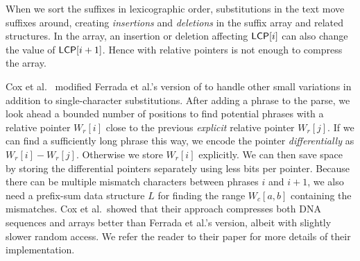 When we sort the suffixes in lexicographic order, substitutions in the text move suffixes around, creating \emph{insertions} and \emph{deletions} in the suffix array and related structures. In the \LCP{} array, an insertion or deletion affecting $\mathsf{LCP}[i]$ can also change the value of $\mathsf{LCP}[i+1]$. Hence \RLZ{} with relative pointers is not enough to compress the \LCP{} array.

Cox et al.~\cite{CoxEtAl16} modified Ferrada et al.'s version of \RLZ{} to handle other small variations in addition to single-character substitutions. After adding a phrase to the parse, we look ahead a bounded number of positions to find potential phrases with a relative pointer $W_{r}[i]$ close to the previous \emph{explicit} relative pointer $W_{r}[j]$. If we can find a sufficiently long phrase this way, we encode the pointer \emph{differentially} as $W_{r}[i] - W_{r}[j]$. Otherwise we store $W_{r}[i]$ explicitly. We can then save space by storing the differential pointers separately using less bits per pointer. Because there can be multiple mismatch characters between phrases $i$ and $i+1$, we also need a prefix-sum data structure $L$ for finding the range $W_{c}[a,b]$ containing the mismatches. Cox et al.\ showed that their approach compresses both DNA sequences and \LCP{} arrays better than Ferrada et al.'s version, albeit with slightly slower random access. We refer the reader to their paper for more details of their implementation.

